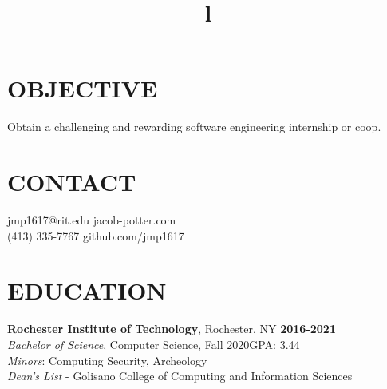 \documentclass[line,margin]{res}
\begin{document}
\begin{resume}

\section{OBJECTIVE}
Obtain a challenging and rewarding software engineering internship or coop.

\section{CONTACT}
{jmp1617@rit.edu}\hfill 
{jacob-potter.com}\\
(413) 335-7767\hfill 
{github.com/jmp1617}

\section{EDUCATION}
\textbf{Rochester Institute of Technology}, Rochester, NY\hfill
    \textbf{2016-2021}\\
{\sl Bachelor of Science}, Computer Science, Fall 2020\hfill GPA: 3.44
\\
{\sl Minors}: Computing Security, Archeology
\\
{\sl Dean's List} - Golisano College of Computing and Information Sciences

\begin{format}
\title{l}\\
\\
\body\\
\end{format}

\end{resume}
\end{document}
